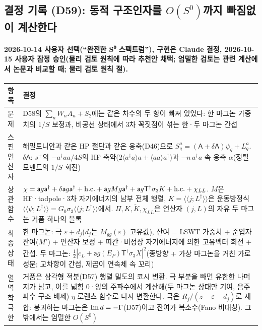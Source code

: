 \endgroup

\subsection{결정 기록 (D59): 동적 구조인자를 $O(S^0)$까지 빠짐없이 계산한다}\label{decisions-d59-structure-s0}
\begingroup%
  \framesubtitle{2026-10-14 사용자 선택(``완전한 S⁰ 스펙트럼''), 구현은 Claude 결정, 2026-10-15 사용자 잠정 승인(물리 검토 원칙에 따라 추천안 채택; 엄밀한 검토는 관련 계산에서 논문과 비교할 때; 물리 검토 원칙 절).}
  \small\renewcommand{\arraystretch}{1.12}
  \begin{tabularx}{\textwidth}{@{}P{3.0cm}Y@{}}
    \toprule
    항목 & 결정 \\
    \midrule
    문제 & D58의 $\sum_nW_nA_n+S_2$에는 같은 차수의 두 항이 빠져 있었다: 한 마그논 가중치의 $1/S$ 보정과, 비공선 상태에서 3차 꼭짓점이 섞는 한·두 마그논 간섭 \\
    스핀 연산자 & 해밀토니안과 같은 HP 절단과 같은 응축(D46)으로 $S^a_q=(\mathsf A+\delta\mathsf A)\psi_q+L^a_q$. $\delta\mathsf A$: $s^+$의 $-a^\dagger aa/4S$의 HF 축약($2\langle a^\dagger a\rangle a+\langle aa\rangle a^\dagger$)과 $-n\,a^\dagger a$ 속 응축 $\alpha$(정렬 모멘트의 $1/S$ 회전) \\
    상관함수 & $\chi=\mathsf ag\mathsf a^\dagger+\delta\mathsf a g\mathsf a^\dagger+{\rm h.c.}+\mathsf agMg\mathsf a^\dagger+\mathsf ag\mathsf T^\dagger\sigma_3K+{\rm h.c.}+\chi_{LL}$. $M$은 HF·tadpole·3차 자기에너지의 남부 전체 행렬, $K=\langle\langle j;L^\dagger\rangle\rangle$은 운동방정식 $\langle\langle\psi;L^\dagger\rangle\rangle=G_0\sigma_3\langle\langle j;L^\dagger\rangle\rangle$에서. $\Pi,K,\tilde K,\chi_{LL}$은 연산자 $(j,L)$의 자유 두 마그논 거품 하나의 블록 \\
    최종 상태 & 한 마그논: 극 $\varepsilon+d_j$($d_j$는 $M_{gg}(\varepsilon)$ 고유값), 잔여 = LSWT 가중치 + 준입자 잔여($M'$) + 연산자 보정 + 띠간·비정상 자기에너지에 의한 고유벡터 회전 + 간섭. 두 마그논: $\tfrac12|c_L+\mathsf ag(E_P)\mathsf T^\dagger\sigma_3X|^2$(종방향 + 가상 마그논을 거친 가로 성분; 교차항이 간섭, 제곱이 연속체 속 꼬리) \\
    열역학 극한 & 거품은 삼각형 적분(D57) 행렬 밀도의 코시 변환. 극 부분을 빼면 유한한 나머지가 남고, 이를 넓힘 0·양의 주파수에서 계산해(두 마그논 상태만 기여, 음주파수 구조 배제) $\eta$ 로렌츠 함수로 다시 변환한다. 극은 $R_j/(z-\varepsilon-d_j)$로 재합: 붕괴하는 마그논은 ${\rm Im}\,d=-\Gamma$(D57)이고 잔여가 복소수(Fano 비대칭). 그 밖에서는 엄밀한 $O(S^0)$ \\

\end{tabularx}
